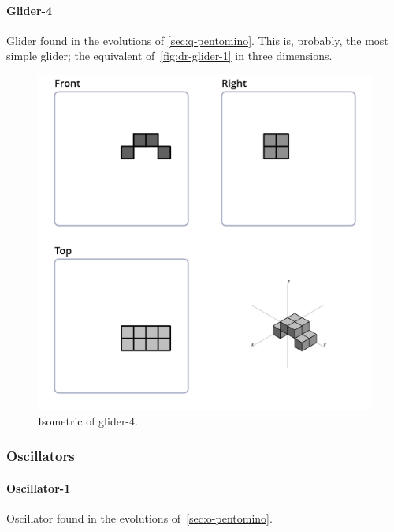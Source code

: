 \paragraph{Glider-4}
Glider found in the evolutions of \ref{sec:q-pentomino}.
This is, probably, the most simple glider; the equivalent
of~\ref{fig:dr-glider-1} in three dimensions.
\begin{figure}
  \centering
  \includegraphics[scale=0.3]{iso_settings/glider_4.png}
  \caption{Isometric of glider-4.}
  \label{fig:iso-glider-4}
\end{figure}


\subsubsection{Oscillators}

\paragraph{Oscillator-1}
Oscillator found in the evolutions of~\ref{sec:o-pentomino}.

